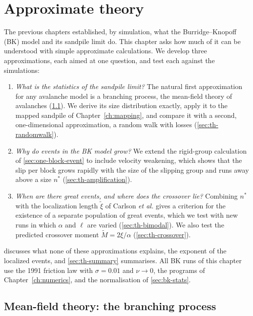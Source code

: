 \chapter{Approximate theory}
\label{ch:theory}



The previous chapters established, by simulation, what the Burridge--Knopoff (BK) model and its sandpile limit do. This chapter asks how much of
it can be understood with simple approximate calculations. We develop three approximations, each aimed at one question, and test each against
the simulations:
\begin{enumerate}
  \item \emph{What is the statistics of the sandpile limit?} The natural first approximation for any avalanche model is a branching process, the
    mean-field theory of avalanches (\cref{sec:th-branching}). We derive its size distribution exactly, apply it to the mapped sandpile of
    Chapter~\ref{ch:mapping}, and compare it with a second, one-dimensional approximation, a random walk with losses (\cref{sec:th-randomwalk}).
  \item \emph{Why do events in the BK model grow?} We extend the rigid-group calculation of \cref{sec:one-block-event} to include velocity
    weakening, which shows that the slip per block grows rapidly with the size of the slipping group and runs away above a size $n^*$
    (\cref{sec:th-amplification}).
  \item \emph{When are there great events, and where does the crossover lie?} Combining $n^*$ with the localization length $\tilde\xi$ of Carlson
    \emph{et al.} gives a criterion for the existence of a separate population of great events, which we test with new runs in which $\alpha$ and $\ell$
    are varied (\cref{sec:th-bimodal}). We also test the predicted crossover moment $\tilde M = 2\xi/\alpha$ (\cref{sec:th-crossover}).
\end{enumerate}
 discusses what none of these approximations explains, the exponent of the localized events, and \cref{sec:th-summary}
summarises. All BK runs of this chapter use the 1991 friction law with $\sigma = 0.01$ and $\nu\to0$, the programs of Chapter~\ref{ch:numerics},
and the normalisation of \cref{sec:bk-stats}.

\section{Mean-field theory: the branching process}
\label{sec:th-branching}

